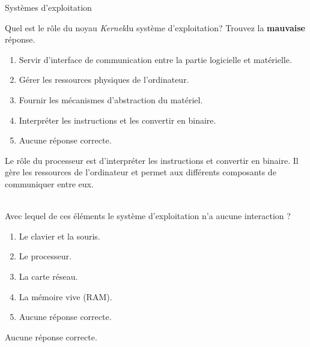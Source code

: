 \begin{section}{Systèmes d'exploitation}
    \begin{Exercice}[2 minutes]
        Quel est le rôle du noyau \textit{Kernel}du système d'exploitation? Trouvez la \textbf{mauvaise} réponse.
        \begin{enumerate}
            \item Servir d'interface de communication entre la partie logicielle et matérielle.
            \item Gérer les ressources physiques de l'ordinateur.
            \item Fournir les mécanismes d'abstraction du matériel.
            \item Interpréter les instructions et les convertir en binaire.
            \item Aucune réponse correcte.
        \end{enumerate}
    \end{Exercice}
    \begin{solution}
                Le rôle du processeur est d'interpréter les instructions et convertir en binaire. Il gère les ressources de l'ordinateur et permet aux différents composants de communiquer entre eux.
    \end{solution}
    
    \begin{Exercice}[2 minutes]\\
    Avec lequel de ces éléments le système d'exploitation n'a aucune interaction ?
        \begin{enumerate}
            \item Le clavier et la souris.
            \item Le processeur.
            \item La carte réseau.
            \item La mémoire vive (RAM).
            \item Aucune réponse correcte.
        \end{enumerate}
    \end{Exercice}
    \begin{solution}
            Aucune réponse correcte. \\
        
    \end{solution}


\end{section}
